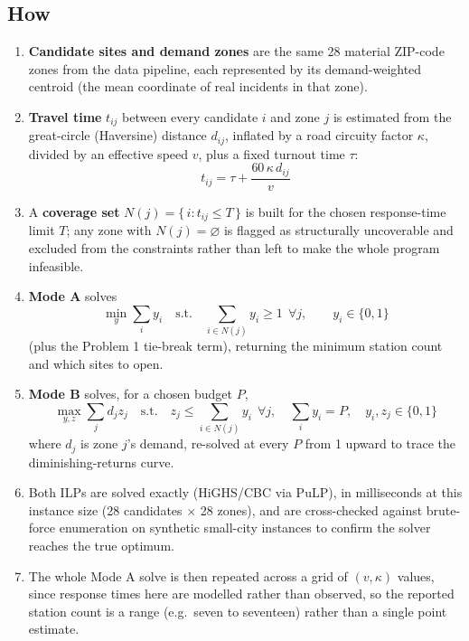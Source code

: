 \documentclass[11pt]{article}
\begin{document}
\subsection*{How}
\begin{enumerate}
  \item \textbf{Candidate sites and demand zones} are the same 28 material
    ZIP-code zones from the data pipeline, each represented by its
    demand-weighted centroid (the mean coordinate of real incidents in that
    zone).
  \item \textbf{Travel time} $t_{ij}$ between every candidate $i$ and zone $j$
    is estimated from the great-circle (Haversine) distance $d_{ij}$, inflated
    by a road circuity factor $\kappa$, divided by an effective speed $v$, plus
    a fixed turnout time $\tau$:
    \[
      t_{ij} = \tau + \frac{60\,\kappa\, d_{ij}}{v}
    \]
  \item A \textbf{coverage set} $N(j) = \{\,i : t_{ij} \le T\,\}$ is built for
    the chosen response-time limit $T$; any zone with $N(j)=\varnothing$ is
    flagged as structurally uncoverable and excluded from the constraints
    rather than left to make the whole program infeasible.
  \item \textbf{Mode A} solves
    \[
      \min_y \sum_{i} y_i \quad\text{s.t.}\quad \sum_{i\in N(j)} y_i \ge 1\ \ \forall j,
      \qquad y_i \in \{0,1\}
    \]
    (plus the Problem 1 tie-break term), returning the minimum station count
    and which sites to open.
  \item \textbf{Mode B} solves, for a chosen budget $P$,
    \[
      \max_{y,z} \sum_{j} d_j z_j \quad\text{s.t.}\quad
      z_j \le \sum_{i\in N(j)} y_i\ \ \forall j, \quad \sum_i y_i = P,
      \quad y_i,z_j\in\{0,1\}
    \]
    where $d_j$ is zone $j$'s demand, re-solved at every $P$ from 1 upward to
    trace the diminishing-returns curve.
  \item Both ILPs are solved exactly (HiGHS/CBC via PuLP), in milliseconds at
    this instance size (28 candidates $\times$ 28 zones), and are
    cross-checked against brute-force enumeration on synthetic small-city
    instances to confirm the solver reaches the true optimum.
  \item The whole Mode A solve is then repeated across a grid of $(v,\kappa)$
    values, since response times here are modelled rather than observed, so
    the reported station count is a range (e.g.\ seven to seventeen) rather
    than a single point estimate.
\end{enumerate}
\end{document}
